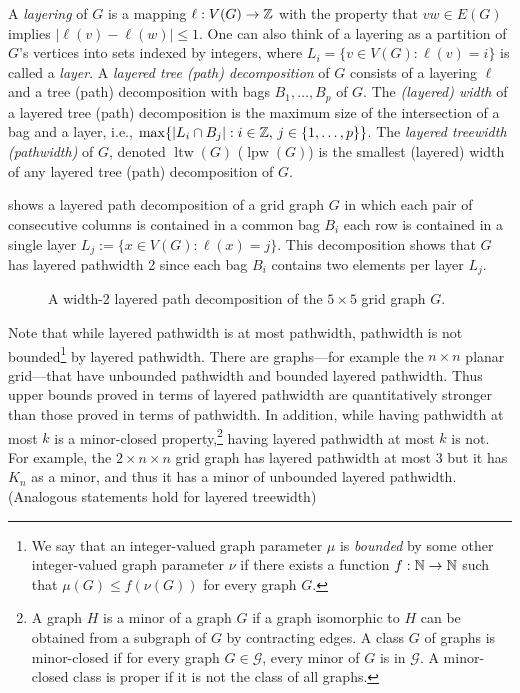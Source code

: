 \documentclass{patmorin}
\DeclareMathOperator{\lpw}{lpw}
\DeclareMathOperator{\ltw}{ltw}
\begin{document}
   A \emph{layering} of $G$ is a mapping $\ell:V(G)\to\mathbb{Z}$ with the
property that $vw\in E(G)$ implies $|\ell(v)-\ell(w)|\le 1$. One
can also think of a layering as a partition of $G$'s vertices into
sets indexed by integers, where $L_i=\{v\in V(G)
: \ell(v)=i\}$ is called a  \emph{layer}.  A \emph{layered tree (path) decomposition} of $G$ consists
of a layering $\ell$ and a tree (path) decomposition with bags $B_1,\ldots,B_p$ of $G$.
The \emph{(layered) width} of a layered tree (path) decomposition is the maximum
size of the intersection of a bag and a layer, i.e., $\max\{|L_i\cap
B_j|:i\in\mathbb{Z},\, j\in\{1,\ldots,p\}\}$.  The \emph{layered treewidth (pathwidth)} of
$G$, denoted $\ltw(G)$ ($\lpw(G)$) is the smallest (layered) width of any layered
tree (path) decomposition of $G$.

 shows a layered path decomposition of a grid graph $G$ in which each pair of consecutive columns is contained in a common bag $B_i$ each row is contained in a single layer $L_j:=\{x\in V(G):\ell(x)=j\}$.  This decomposition shows that $G$ has layered pathwidth 2 since each bag $B_i$ contains two elements per layer $L_j$.
\begin{figure}
    \caption{A width-2 layered path decomposition of the $5\times 5$ grid graph $G$.}
\end{figure}


Note that while layered pathwidth is at most pathwidth, pathwidth is
not bounded\footnote{We say that an integer-valued graph parameter $\mu$ is \emph{bounded} by some other integer-valued graph parameter $\nu$ if there exists a function $f:\mathbb{N}\to\mathbb{N}$ such that $\mu(G)\le f(\nu(G))$ for every graph $G$.} by layered pathwidth. There are graphs---for example the $n \times
n$ planar grid---that have unbounded pathwidth and bounded layered
pathwidth. Thus upper bounds proved in terms of layered pathwidth are
quantitatively stronger than those proved in terms of pathwidth. In addition, while having pathwidth at most $k$ is a minor-closed property,\footnote{A graph $H$ is a minor of a graph $G$ if a graph isomorphic to $H$ can be obtained from a
subgraph of $G$ by contracting edges. A class $G$ of graphs is minor-closed if for every graph $G\in\mathcal{G}$, every minor of $G$
is in $\mathcal{G}$. A minor-closed class is proper if it is not the class of all graphs.} having layered pathwidth at most $k$ is not.  For
example, the $2 \times n \times n$ grid graph has layered pathwidth at most $3$ but
it has  $K_n$ as a minor, and thus it has a minor of unbounded layered pathwidth. (Analogous statements hold for layered treewidth)
\end{document}
